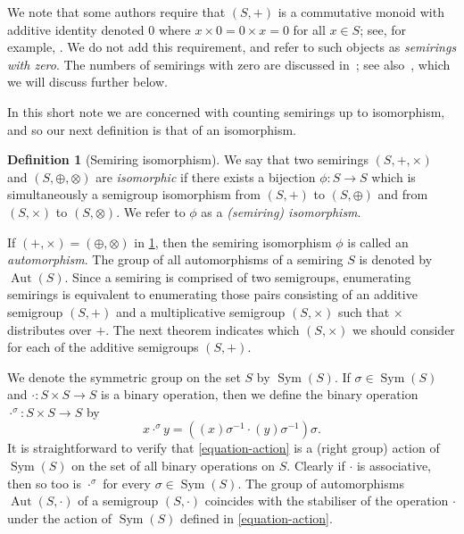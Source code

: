 \documentclass{article}
\theoremstyle{definition}
\newtheorem{defn}{Definition}[section]
\theoremstyle{plain}
\newcommand{\Sym}{\operatorname{Sym}}
\newcommand{\Aut}{\operatorname{Aut}}
\begin{document}
We note that some authors require that $(S, +)$ is a commutative monoid with
additive identity denoted $0$ where $x\times 0 = 0 \times x = 0$ for all $x\in
S$; see, for example, \cite{Lothaire2005, Sakarovitch2009}.
We do not add this requirement, and refer to such objects as \textit{semirings
with zero}. The numbers of semirings with zero are discussed
in~\cite{stackexchange}; see also~\cite{baueralg}, which we will discuss further
below.

In this short note we are concerned with counting semirings up to isomorphism,
and so our next definition is that of an isomorphism.


\begin{defn}[Semiring isomorphism]\label{defn-semiring-iso}
  We say that two semirings \((S,+,\times)\) and \((S, \oplus, \otimes)\) are
  \emph{isomorphic} if there exists a bijection \(\phi: S \to S\) which is
  simultaneously a semigroup isomorphism from $(S, +)$ to $(S, \oplus)$ and
  from $(S, \times)$ to $(S, \otimes)$. We refer to $\phi$ as a
  \textit{(semiring) isomorphism}.
\end{defn}

If \((+,\times)=(\oplus, \otimes)\) in \cref{defn-semiring-iso}, then the
semiring isomorphism $\phi$ is called an \textit{automorphism}. The group of
all automorphisms of a semiring $S$ is denoted by $\Aut(S)$.
Since a semiring is comprised of two semigroups, enumerating semirings is
equivalent to enumerating those pairs consisting of an additive semigroup $(S,
+)$ and a multiplicative semigroup $(S, \times)$ such that $\times$ distributes
over $+$. The next theorem indicates which $(S, \times)$ we should consider
for each of the additive semigroups $(S, +)$.

We denote the symmetric group on the set $S$ by $\Sym(S)$.
If $\sigma\in \Sym(S)$ and
$\cdot: S \times S \to S$ is a binary operation, then we define the binary
operation $\cdot ^ \sigma: S\times S \to S$ by
\begin{equation}\label{equation-action}
  x \cdot ^ \sigma y = ((x)\sigma^{-1} \cdot (y)\sigma ^ {-1})\sigma.
\end{equation}
It is straightforward to verify that \eqref{equation-action} is a (right group)
action of $\Sym(S)$ on the set of all binary operations on $S$. Clearly if
$\cdot$ is associative, then so too is $\cdot ^ \sigma$ for every $\sigma \in
\Sym(S)$. The group of automorphisms $\Aut(S,\cdot)$ of a
semigroup $(S, \cdot)$ coincides with the stabiliser of the operation $\cdot$
under the action of $\Sym(S)$ defined in \eqref{equation-action}.
\end{document}
